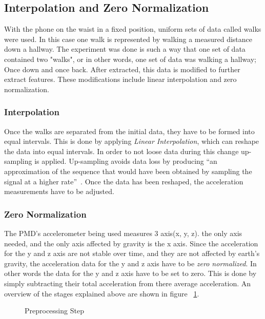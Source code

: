\documentclass{sig-alternate}
\begin{document}
\subsection{Interpolation and Zero Normalization }	
	With the phone on the waist in a fixed position, uniform sets of data called walks were used. In this case one walk is represented by walking a measured distance down a hallway. The experiment was done is such a way that one set of data contained two "walks", or in other words, one set of data was walking a hallway; Once down and once back. After extracted, this data is modified to further extract features. These modifications include linear interpolation and zero normalization. 
	
\subsubsection{Interpolation} 
	Once the walks are separated from the initial data, they have to be formed into equal intervals. This is done by applying \textit{Linear Interpolation}, which can reshape the data  into equal intervals. In order to not loose data during this change up-sampling is applied. Up-sampling avoids data loss by producing ``an approximation of the sequence that would have been obtained by sampling the signal at a higher rate''~\cite{wiki1:2014}. Once the data has been reshaped, the acceleration measurements have to be adjusted. 
	
\subsubsection{Zero Normalization}
	The PMD's accelerometer being used measures 3 axis(x, y, z). the only axis needed, and the only axis affected by gravity is the x axis. Since the acceleration for the y and z axis are not stable over time, and they are not affected by earth's gravity, the acceleration data for the y and z axis have to be \textit{zero normalized}. In other words the data for the y and z axis have to be set to zero. This is done by simply subtracting their total acceleration from there average acceleration. An overview of the stages explained above are shown in figure ~\ref{fig:firstStep}.

\begin{figure}
\centering
{}
\caption{Preprocessing Step}
\label{fig:firstStep}
\end{figure}
\end{document}
